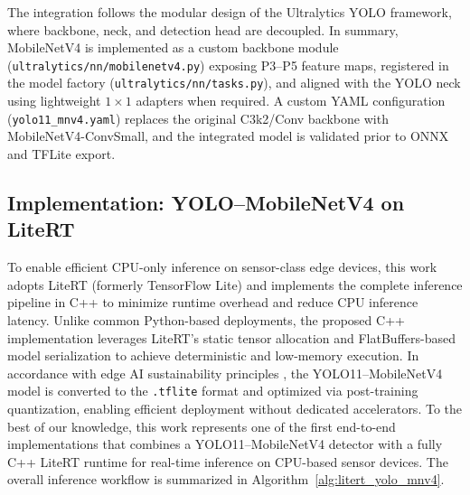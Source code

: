 The integration follows the modular design of the Ultralytics YOLO framework, where backbone, neck, and detection head are decoupled. In summary, MobileNetV4 is implemented as a custom backbone module (\texttt{ultralytics/nn/mobilenetv4.py}) exposing P3--P5 feature maps, registered in the model factory (\texttt{ultralytics/nn/tasks.py}), and aligned with the YOLO neck using lightweight $1\times1$ adapters when required. A custom YAML configuration (\texttt{yolo11\_mnv4.yaml}) replaces the original C3k2/Conv backbone with MobileNetV4-ConvSmall, and the integrated model is validated prior to ONNX and TFLite export.


\subsection{Implementation: YOLO--MobileNetV4 on LiteRT}
\label{subsec:impl_litert_cpp}

To enable efficient CPU-only inference on sensor-class edge devices, this work adopts LiteRT (formerly TensorFlow Lite) and implements the complete inference pipeline in C++ to minimize runtime overhead and reduce CPU inference latency. Unlike common Python-based deployments, the proposed C++ implementation leverages LiteRT’s static tensor allocation and FlatBuffers-based model serialization to achieve deterministic and low-memory execution. In accordance with edge AI sustainability principles \cite{11214219}, the YOLO11--MobileNetV4 model is converted to the \texttt{.tflite} format and optimized via post-training quantization, enabling efficient deployment without dedicated accelerators. To the best of our knowledge, this work represents one of the first end-to-end implementations that combines a YOLO11--MobileNetV4 detector with a fully C++ LiteRT runtime for real-time inference on CPU-based sensor devices. The overall inference workflow is summarized in Algorithm~\ref{alg:litert_yolo_mnv4}.


